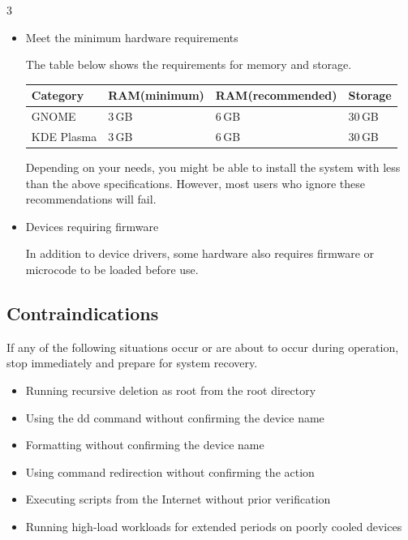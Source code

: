 \documentclass{article}
\begin{document}
\begin{multicols*}{3}
\begin{itemize}[leftmargin=*]
		\item Meet the minimum hardware requirements

		The table below shows the requirements for memory and storage.

		{\small\begin{tabularx}{\linewidth}{|X|X|X|X|}
			\hline
			Category & RAM\newline (minimum) & RAM\newline (recommended) & Storage \\
			\hline
			GNOME & 3 GB & 6 GB & 30 GB \\
			\hline
			KDE Plasma & 3 GB & 6 GB & 30 GB \\
			\hline
		\end{tabularx}}

		Depending on your needs, you might be able to install the system with less than the above specifications. However, most users who ignore these recommendations will fail.

		\item Devices requiring firmware

		In addition to device drivers, some hardware also requires firmware or microcode to be loaded before use.

	\end{itemize}


	\begin{tcolorbox}
	\section*{Contraindications}
	\end{tcolorbox}

	If any of the following situations occur or are about to occur during operation, stop immediately and prepare for system recovery.

	\begin{itemize}[leftmargin=*]
		\setlength{\itemsep}{0pt}
		\setlength{\parskip}{0pt}
		\setlength{\parsep}{0pt}

		\item Running recursive deletion as root from the root directory
		\item Using the dd command without confirming the device name
		\item Formatting without confirming the device name
		\item Using command redirection without confirming the action
		\item Executing scripts from the Internet without prior verification
		\item Running high‑load workloads for extended periods on poorly cooled devices
	\end{itemize}


\end{multicols*}
\end{document}
